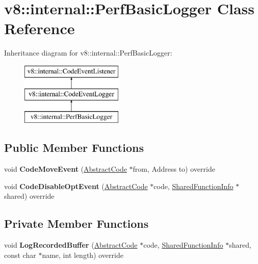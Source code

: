 \hypertarget{classv8_1_1internal_1_1_perf_basic_logger}{}\section{v8\+:\+:internal\+:\+:Perf\+Basic\+Logger Class Reference}
\label{classv8_1_1internal_1_1_perf_basic_logger}
Inheritance diagram for v8\+:\+:internal\+:\+:Perf\+Basic\+Logger\+:\begin{figure}[H]
\begin{center}
\leavevmode
\includegraphics[height=3.000000cm]{classv8_1_1internal_1_1_perf_basic_logger}
\end{center}
\end{figure}
\subsection*{Public Member Functions}
\begin{DoxyCompactItemize}
\item 
void {\bfseries Code\+Move\+Event} (\hyperlink{classv8_1_1internal_1_1_abstract_code}{Abstract\+Code} $\ast$from, Address to) override\hypertarget{classv8_1_1internal_1_1_perf_basic_logger_aefb922c3631929e7242cf43f6f5d1c65}{}\label{classv8_1_1internal_1_1_perf_basic_logger_aefb922c3631929e7242cf43f6f5d1c65}

\item 
void {\bfseries Code\+Disable\+Opt\+Event} (\hyperlink{classv8_1_1internal_1_1_abstract_code}{Abstract\+Code} $\ast$code, \hyperlink{classv8_1_1internal_1_1_shared_function_info}{Shared\+Function\+Info} $\ast$shared) override\hypertarget{classv8_1_1internal_1_1_perf_basic_logger_a9cbacc546ea95cd42894d5c6f1fa2ce2}{}\label{classv8_1_1internal_1_1_perf_basic_logger_a9cbacc546ea95cd42894d5c6f1fa2ce2}

\end{DoxyCompactItemize}
\subsection*{Private Member Functions}
\begin{DoxyCompactItemize}
\item 
void {\bfseries Log\+Recorded\+Buffer} (\hyperlink{classv8_1_1internal_1_1_abstract_code}{Abstract\+Code} $\ast$code, \hyperlink{classv8_1_1internal_1_1_shared_function_info}{Shared\+Function\+Info} $\ast$shared, const char $\ast$name, int length) override\hypertarget{classv8_1_1internal_1_1_perf_basic_logger_a0f0d13a7617fc187995224625110a52f}{}\label{classv8_1_1internal_1_1_perf_basic_logger_a0f0d13a7617fc187995224625110a52f}

\end{DoxyCompactItemize}
